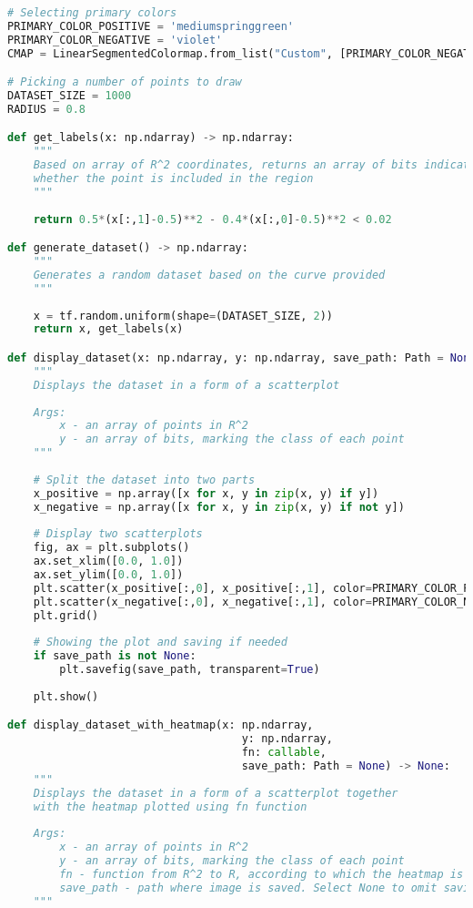 \begin{lstlisting}[language=Python]
# Selecting primary colors
PRIMARY_COLOR_POSITIVE = 'mediumspringgreen'
PRIMARY_COLOR_NEGATIVE = 'violet'
CMAP = LinearSegmentedColormap.from_list("Custom", [PRIMARY_COLOR_NEGATIVE, PRIMARY_COLOR_POSITIVE], N=20)

# Picking a number of points to draw
DATASET_SIZE = 1000
RADIUS = 0.8

def get_labels(x: np.ndarray) -> np.ndarray:
    """
    Based on array of R^2 coordinates, returns an array of bits indicating
    whether the point is included in the region
    """
    
    return 0.5*(x[:,1]-0.5)**2 - 0.4*(x[:,0]-0.5)**2 < 0.02

def generate_dataset() -> np.ndarray:
    """
    Generates a random dataset based on the curve provided
    """
    
    x = tf.random.uniform(shape=(DATASET_SIZE, 2))
    return x, get_labels(x)

def display_dataset(x: np.ndarray, y: np.ndarray, save_path: Path = None) -> None:
    """
    Displays the dataset in a form of a scatterplot
    
    Args:
        x - an array of points in R^2
        y - an array of bits, marking the class of each point
    """
    
    # Split the dataset into two parts
    x_positive = np.array([x for x, y in zip(x, y) if y])
    x_negative = np.array([x for x, y in zip(x, y) if not y])
    
    # Display two scatterplots
    fig, ax = plt.subplots()
    ax.set_xlim([0.0, 1.0])
    ax.set_ylim([0.0, 1.0])
    plt.scatter(x_positive[:,0], x_positive[:,1], color=PRIMARY_COLOR_POSITIVE, edgecolors='black')
    plt.scatter(x_negative[:,0], x_negative[:,1], color=PRIMARY_COLOR_NEGATIVE, edgecolors='black')
    plt.grid()
    
    # Showing the plot and saving if needed
    if save_path is not None:
        plt.savefig(save_path, transparent=True)
    
    plt.show()

def display_dataset_with_heatmap(x: np.ndarray, 
                                    y: np.ndarray, 
                                    fn: callable, 
                                    save_path: Path = None) -> None:
    """
    Displays the dataset in a form of a scatterplot together
    with the heatmap plotted using fn function
    
    Args:
        x - an array of points in R^2
        y - an array of bits, marking the class of each point
        fn - function from R^2 to R, according to which the heatmap is built
        save_path - path where image is saved. Select None to omit saving
    """
    

\end{lstlisting}
